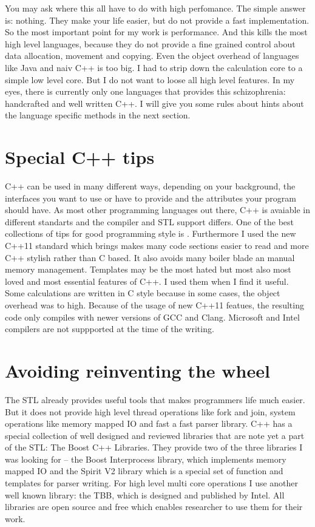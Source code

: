\documentclass[%
	fontsize=11pt,%
	paper=a4,%
	pagesize,%
	twoside=false,%
	listof=totoc,%
	draft%
]{scrbook}
\begin{document}
You may ask where this all have to do with high perfomance. The simple answer is: nothing. They make your life easier, but do not provide a fast implementation. So the most important point for my work is performance. And this kills the most high level languages, because they do not provide a fine grained control about data allocation, movement and copying. Even the object overhead of languages like Java and naiv C++ is too big. I had to strip down the calculation core to a simple low level core. But I do not want to loose all high level features. In my eyes, there is currently only one languages that provides this schizophrenia: handcrafted and well written C++. I will give you some rules about hints about the language specific methods in the next section.

\section{Special C++ tips}
C++ can be used in many different ways, depending on your background, the interfaces you want to use or have to provide and the attributes your program should have. As most other programming languages out there, C++ is avaiable in different standarts and the compiler and STL support differs. One of the best collections of tips for good programming style is \cite{effectiveCpp}. Furthermore I used the new C++11 standard which brings makes many code sections easier to read and more C++ stylish rather than C based. It also avoids many boiler blade an manual memory management. Templates may be the most hated but most also most loved and most essential features of C++. I used them when I find it useful. Some calculations are written in C style because in some cases, the object overhead was to high. Because of the usage of new C++11 featues, the resulting code only compiles with newer versions of GCC and Clang. Microsoft and Intel compilers are not suppported at the time of the writing.

\section{Avoiding reinventing the wheel}
The STL already provides useful tools that makes programmers life much easier. But it does not provide high level thread operations like fork and join, system operations like memory mapped IO and fast a fast parser library. C++ has a special collection of well designed and reviewed libraries that are note yet a part of the STL: The Boost C++ Libraries. They provide two of the three libraries I was looking for -- the Boost Interprocess library, which implements memory mapped IO and the Spirit V2 library which is a special set of function and templates for parser writing. For high level multi core operations I use another well known library: the TBB, which is designed and published by Intel. All libraries are open source and free which enables researcher to use them for their work.
\end{document}
